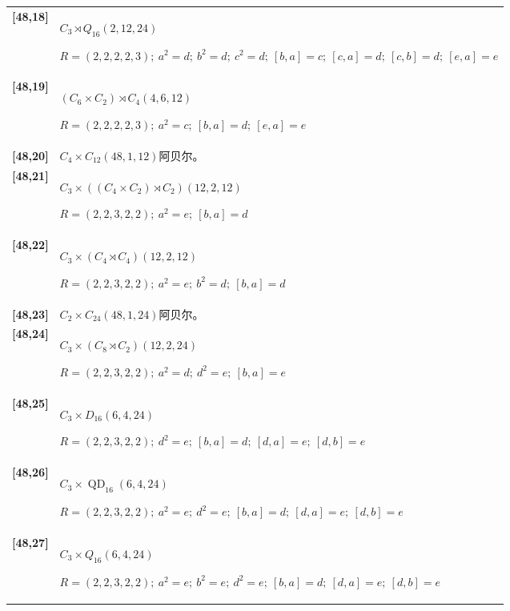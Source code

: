 \documentclass[UTF8,fontset=fandol,11pt,a4paper]{ctexart}
\begin{document}
\begin{longtable}{@{}p{17mm}>{\raggedright\arraybackslash}p{141mm}@{}}
\textbf{[48,18]} & $C_{3}\rtimes Q_{16}$\quad $(2,12,24)$\par\(R=(2,2,2,2,3);\allowbreak\ a^{2}=d;\allowbreak\ b^{2}=d;\allowbreak\ c^{2}=d;\allowbreak\ [b,a]=c;\allowbreak\ [c,a]=d;\allowbreak\ [c,b]=d;\allowbreak\ [e,a]=e\)\\[3pt]

\textbf{[48,19]} & $(C_{6}\times C_{2})\rtimes C_{4}$\quad $(4,6,12)$\par\(R=(2,2,2,2,3);\allowbreak\ a^{2}=c;\allowbreak\ [b,a]=d;\allowbreak\ [e,a]=e\)\\[3pt]

\textbf{[48,20]} & $C_{4}\times C_{12}$\quad $(48,1,12)$\quad 阿贝尔。\\[3pt]

\textbf{[48,21]} & $C_{3}\times ((C_{4}\times C_{2})\rtimes C_{2})$\quad $(12,2,12)$\par\(R=(2,2,3,2,2);\allowbreak\ a^{2}=e;\allowbreak\ [b,a]=d\)\\[3pt]

\textbf{[48,22]} & $C_{3}\times (C_{4}\rtimes C_{4})$\quad $(12,2,12)$\par\(R=(2,2,3,2,2);\allowbreak\ a^{2}=e;\allowbreak\ b^{2}=d;\allowbreak\ [b,a]=d\)\\[3pt]

\textbf{[48,23]} & $C_{2}\times C_{24}$\quad $(48,1,24)$\quad 阿贝尔。\\[3pt]

\textbf{[48,24]} & $C_{3}\times (C_{8}\rtimes C_{2})$\quad $(12,2,24)$\par\(R=(2,2,3,2,2);\allowbreak\ a^{2}=d;\allowbreak\ d^{2}=e;\allowbreak\ [b,a]=e\)\\[3pt]

\textbf{[48,25]} & $C_{3}\times D_{16}$\quad $(6,4,24)$\par\(R=(2,2,3,2,2);\allowbreak\ d^{2}=e;\allowbreak\ [b,a]=d;\allowbreak\ [d,a]=e;\allowbreak\ [d,b]=e\)\\[3pt]

\textbf{[48,26]} & $C_{3}\times \operatorname{QD}_{16}$\quad $(6,4,24)$\par\(R=(2,2,3,2,2);\allowbreak\ a^{2}=e;\allowbreak\ d^{2}=e;\allowbreak\ [b,a]=d;\allowbreak\ [d,a]=e;\allowbreak\ [d,b]=e\)\\[3pt]

\textbf{[48,27]} & $C_{3}\times Q_{16}$\quad $(6,4,24)$\par\(R=(2,2,3,2,2);\allowbreak\ a^{2}=e;\allowbreak\ b^{2}=e;\allowbreak\ d^{2}=e;\allowbreak\ [b,a]=d;\allowbreak\ [d,a]=e;\allowbreak\ [d,b]=e\)\\[3pt]


\end{longtable}
\end{document}
